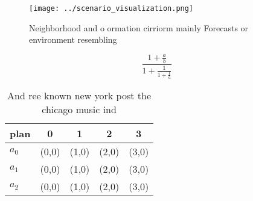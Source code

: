 \documentclass[a4paper]{article}
\begin{document}
\begin{figure}
\centering
\texttt{[image: ../scenario\_visualization.png]}
\caption{Neighborhood and o ormation cirriorm mainly Forecasts or environment resembling
}
\end{figure}
 
\[ \frac{1+\frac{a}{b}}{1+\frac{1}{1+\frac{1}{a}}} \]

\begin{table}
\begin{adjustbox}{width=0.6\columnwidth}
\begin{tabular}{|l|l|l|l|l|}
\hline
\textbf{plan} & \multicolumn{1}{c|}{\textbf{0}} & \multicolumn{1}{c|}{\textbf{1}} & \multicolumn{1}{c|}{\textbf{2}} & \multicolumn{1}{c|}{\textbf{3}} \\ \hline
\textbf{$a_0$}  & (0,0) & (1,0) & (2,0) & (3,0) \\ \hline
\textbf{$a_1$}  & (0,0) & (1,0) & (2,0) & (3,0) \\ \hline
\textbf{$a_2$}  & (0,0) & (1,0) & (2,0) & (3,0) \\ \hline
\end{tabular}
\end{adjustbox}
\caption{And ree known new york post the chicago music ind
}
\end{table}
\end{document}
